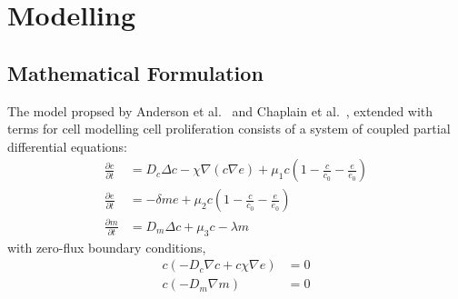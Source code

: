 \section{Modelling}

\subsection{Mathematical Formulation}

The model propsed by Anderson et al.~\cite{anderson_continuous_1998,anderson_mathematical_2000} and Chaplain et al.~\cite{anderson_continuous_1998,chaplain_mathematical_2006-1,franssen_mathematical_2019}, extended with terms for cell modelling cell proliferation consists of a system of coupled partial differential equations: 
\begin{align}
	\frac{\partial c}{\partial t} &= D_c \Delta c - \chi \nabla (c\nabla e)  + \mu_1 c\left(1-\frac{c}{c_0}-\frac{e}{e_0}\right)\label{eq1}\\
	\frac{\partial e}{\partial t} &= -\delta m e  + \mu_2 c\left(1-\frac{c}{c_0}-\frac{e}{e_0}\right)\label{eq2}\\
	\frac{\partial m}{\partial t} &= D_m \Delta c + \mu_3 c - \lambda m\label{eq3}
\end{align}
with zero-flux boundary conditions, 
\begin{align}
	c (-D_c \nabla c + c \chi\nabla e) &= 0 \label{eq4}\\
	c (-D_m\nabla m ) &= 0\label{eq5}
\end{align}

